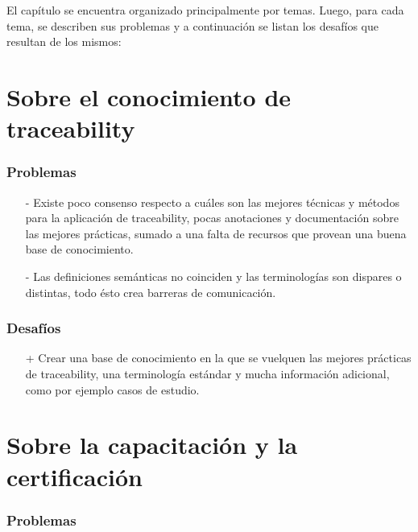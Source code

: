 \documentclass[a4paper,12pt,oneside,spanish]{book}
\begin{document}
El capítulo se encuentra organizado principalmente por temas. Luego, para cada tema, se describen sus problemas y a continuación se listan los desafíos que resultan de los mismos:

\section{Sobre el conocimiento de traceability}

\subsubsection{Problemas}

\begin{itemize}

\item[-] Existe poco consenso respecto a cuáles son las mejores técnicas y métodos para la aplicación de traceability, pocas anotaciones y documentación sobre las mejores prácticas, sumado a una falta de recursos que provean una buena base de conocimiento.

\item[-] Las definiciones semánticas no coinciden y las terminologías son dispares o distintas, todo ésto crea barreras de comunicación.

\end{itemize}

\subsubsection{Desafíos}

\begin{itemize}

\item[+] Crear una base de conocimiento en la que se vuelquen las mejores prácticas de traceability, una terminología estándar y mucha información adicional, como por ejemplo casos de estudio.

\end{itemize}

\section{Sobre la capacitación y la certificación}

\subsubsection{Problemas}
\end{document}
